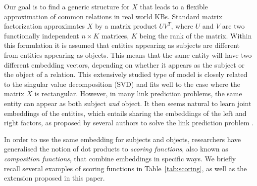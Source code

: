 \documentclass{article}
\newcommand{\transp}{^{T}}
\renewcommand{\Re}{\mathbb{R}}
\newcommand{\Relation}{\mathbf{X}}
\newcommand{\score}{s}
\newcommand{\Johans}[1]{\todo[inline,backgroundcolor=green!20!green]{Johans: #1}}
\newcommand{\Eric}[1]{\todo[inline,backgroundcolor=blue!20!white]{Eric: #1}}
\begin{document}
Our goal is to find a 
generic structure for $X$ that leads to a flexible approximation of common relations in real world KBs. Standard matrix factorization approximates $X$ by 
a matrix product $UV\transp$, where $U$ and $V$ are two functionally independent $n\times K$ matrices, $K$ being the rank of the matrix. Within this formulation it is assumed that entities appearing as subjects are different from entities appearing as objects. This means that the same entity will have two different embedding vectors, depending on whether it appears as the subject or the object of a relation. 
This extensively studied type of model is closely related to the singular value decomposition (SVD) and fits well to the case where the matrix $X$ is rectangular. %
However, in many link prediction problems, the same entity can appear as both subject
\emph{and} object. It then seems natural to learn joint embeddings of the entities, 
which entails sharing the embeddings of the left and right factors, as proposed %
by several authors to solve the link prediction problem \cite{Nickel2011,bordes2013translating,Yang2015}. 

In order to use the same embedding for subjects and objects, researchers have generalised the notion of dot products to \emph{scoring functions}, also known as \emph{composition functions}, that combine embeddings in specific ways. %
We briefly recall several examples of scoring functions in Table~\ref{tab:scoring}, as well
as the extension proposed in this paper. %
\end{document}
